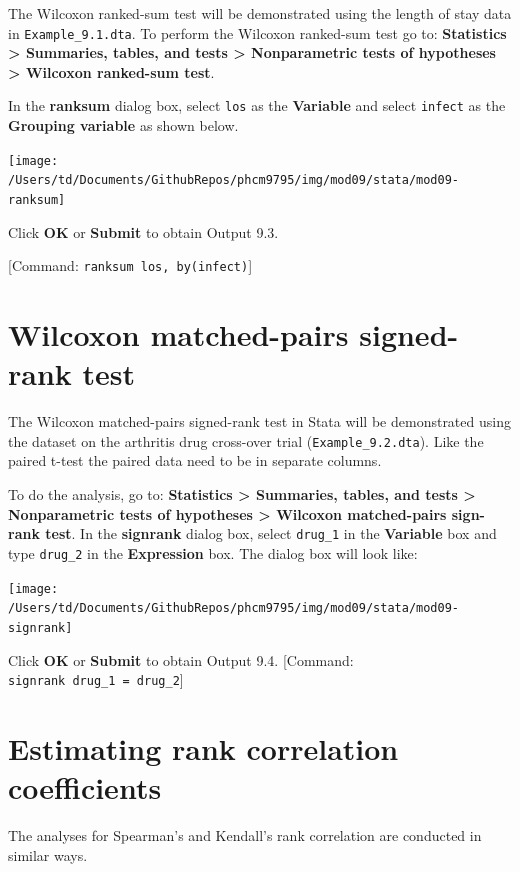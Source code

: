 \documentclass[
]{memoir}
\begin{document}
The Wilcoxon ranked-sum test will be demonstrated using the length of stay data in \texttt{Example\_9.1.dta}. To perform the Wilcoxon ranked-sum test go to: \textbf{Statistics \textgreater{} Summaries, tables, and tests \textgreater{} Nonparametric tests of hypotheses \textgreater{} Wilcoxon ranked-sum test}.

In the \textbf{ranksum} dialog box, select \texttt{los} as the \textbf{Variable} and select \texttt{infect} as the \textbf{Grouping variable} as shown below.

\texttt{[image: /Users/td/Documents/GithubRepos/phcm9795/img/mod09/stata/mod09-ranksum]}

Click \textbf{OK} or \textbf{Submit} to obtain Output 9.3.

{[}Command: \texttt{ranksum\ los,\ by(infect)}{]}

\hypertarget{wilcoxon-matched-pairs-signed-rank-test}{%
\section{Wilcoxon matched-pairs signed-rank test}\label{wilcoxon-matched-pairs-signed-rank-test}}

The Wilcoxon matched-pairs signed-rank test in Stata will be demonstrated using the dataset on the arthritis drug cross-over trial (\texttt{Example\_9.2.dta}). Like the paired t-test the paired data need to be in separate columns.

To do the analysis, go to: \textbf{Statistics \textgreater{} Summaries, tables, and tests \textgreater{} Nonparametric tests of hypotheses \textgreater{} Wilcoxon matched-pairs sign-rank test}. In the \textbf{signrank} dialog box, select \texttt{drug\_1} in the \textbf{Variable} box and type \texttt{drug\_2} in the \textbf{Expression} box. The dialog box will look like:

\texttt{[image: /Users/td/Documents/GithubRepos/phcm9795/img/mod09/stata/mod09-signrank]}

Click \textbf{OK} or \textbf{Submit} to obtain Output 9.4.
{[}Command: \texttt{signrank\ drug\_1\ =\ drug\_2}{]}

\hypertarget{estimating-rank-correlation-coefficients}{%
\section{Estimating rank correlation coefficients}\label{estimating-rank-correlation-coefficients}}

The analyses for Spearman's and Kendall's rank correlation are conducted in similar ways.
\end{document}
